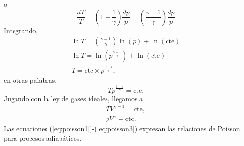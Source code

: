 \documentclass[openany]{book}
\begin{document}
\begin{itemize}
\begin{equation*}
	      \end{equation*}
	      o \begin{equation}
		      \frac{dT}{T}=\left(1-\frac{1}{\gamma}\right)\frac{dp}{p}=\left(\frac{\gamma-1}{\gamma}\right)\frac{dp}{p}
	      \end{equation}
	      Integrando,
	      \begin{gather*}
		      \ln{T}=\left(\frac{\gamma-1}{\gamma}\right)\ln(p)+\ln{(\mathrm{cte})}\\
		      \ln{T}=\ln\left(p^{\frac{\gamma-1}{\gamma}}\right)+\ln{(\mathrm{cte})}\\
		      T=\mathrm{cte}\times p^{\frac{\gamma-1}{\gamma}},
	      \end{gather*}
	      en otras palabras,
	      \begin{equation}\label{eq:poisson1}
		      Tp^{\frac{1-\gamma}{\gamma}}=\mathrm{cte}.
	      \end{equation}
	      Jugando con la ley de gases ideales, llegamos a
	      \begin{gather}
		      TV^{\gamma-1}=\mathrm{cte}, \label{eq:poisson2}\\
		      pV^{\gamma}=\mathrm{cte}.\label{eq:poisson3}
	      \end{gather}
	      Las ecuaciones (\ref{eq:poisson1})-(\ref{eq:poisson3}) expresan las relaciones de Poisson para procesos adiabáticos.
\end{itemize}
\end{document}
